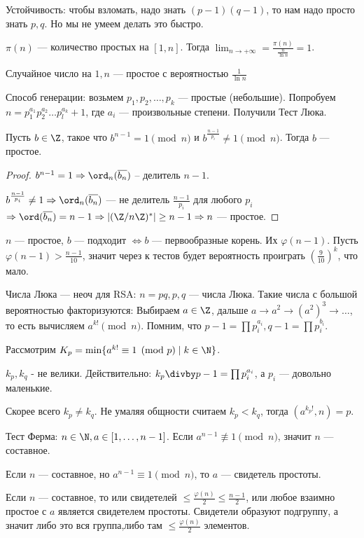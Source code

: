 Устойчивость: чтобы взломать, надо знать $(p-1)(q-1)$, то нам надо просто знать $p, q$. Но мы не умеем делать это быстро.
 \begin{theorem}
     $\pi(n)$ --- количество простых на  $[1, n]$. Тогда  $\lim_{n \to +\infty} = \frac{\pi(n)}{\frac{n}{\ln n}} = 1$.
\end{theorem}
\begin{consequence}
   Случайное число на $1, n$ --- простое с вероятностью  $\frac{1}{\ln n}$ 
\end{consequence}

Способ генерации: возьмем $p_1, p_2,\ldots,p_k$ --- простые (небольшие). Попробуем $n = p_1^{a_1}p_2^{a_2}\ldots p_l^{a_k} + 1$, где $a_i$ --- произвольные степени. Получили Тест Люка.

\begin{theorem}
Пусть  $b \in \Z$, такое что  $b^{n-1}= 1 \pmod{n}$ и  $b^{\frac{n-1}{p_i}} \neq 1 \pmod{n}$. Тогда $b$ --- простое.
\end{theorem}
\begin{proof}
    $b^{n-1} = 1 \Rightarrow \ord_n(\overline{b_n})$ -- делитель  $n - 1$.

    $b^{\frac{n-1}{p_i}} \neq 1 \Rightarrow \ord_n(\overline{b_n})$ --- не делитель $\frac{n-1}{p_i}$ для любого $p_i$  $\Rightarrow \ord(\overline{b_n}) = n-1 \Rightarrow |(\Z / n\Z)^*| \ge n-1 \Rightarrow n$ --- простое.
\end{proof}
\begin{remark}
    $n$ --- простое,  $b$ --- подходит  $\iff b$ --- первообразные корень. Их $\varphi(n-1)$. Пусть $\varphi(n-1) > \frac{n - 1}{10}$, значит через к тестов будет вероятность проиграть $\left(\frac{9}{10}\right)^k$, что мало.
\end{remark}
\begin{remark}
    Числа Люка --- неоч для RSA: $n=pq, p, q$ --- числа Люка. Такие числа с большой вероятностью факторизуются: Выбираем  $a \in \Z$, дальше  $a\to a^2 \to (a^2)^3 \to \ldots$, то есть вычисляем $a^{k!} \pmod{n}$. Помним, что  $p - 1 = \prod p_i^{a_i}, q - 1 = \prod p_i^{b_i}$. 

    Рассмотрим  $K_p = \min \{a^{k!} \equiv 1 \pmod p  \mid k \in \N \}$.  

    $k_p, k_q$ - не велики. Действительно:  $k_p \divby p - 1 = \prod p_i^{a_i}$, а $p_i$ --- довольно маленькие.
    
    Скорее всего $k_p \neq k_q$. Не умаляя общности считаем  $k_p < k_q$, тогда  $(a^{k_p!}, n) = p$. 
\end{remark}
\slashn
Тест Ферма: $n \in \N, a \in [1,\ldots,n-1]$. Если $a^{n-1} \not \equiv 1 \pmod{n}$, значит  $n$ --- составное. 
 \begin{definition}
     Если $n$ --- составное, но  $a^{n-1} \equiv 1 \pmod{n}$, то  $a$ --- свидетель простоты.
\end{definition}
\slashn
Если $n$ --- составное, то или свидетелей  $\le \frac{\varphi(n)}{2} \le \frac{n-1}{2}$, или любое взаимно простое с $a$ является свидетелем простоты. Свидетели образуют подгруппу, а значит либо это вся группа,либо там $\le \frac{\varphi(n)}{2}$ элементов. 

